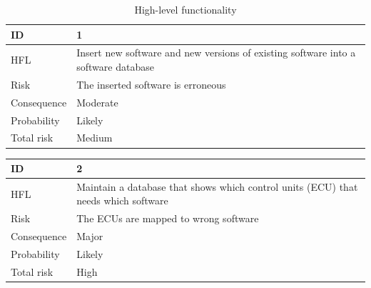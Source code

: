 \begin{table}[H]
\centering
\caption{High-level functionality}
\label{table:hlf}
\begin{tabularx}{1.0\textwidth}{
    |p{}%
    |p{}|%
}
\hline

ID
& 1
\\
\hline

HFL
& Insert new software and new versions of existing software into a software database
\\
\hline

Risk
& 
The inserted software is erroneous
\\
\hline

Consequence
&
Moderate
\\
\hline

Probability
&
Likely
\\
\hline

Total risk
&
Medium
\\
\hline


\end{tabularx}
\end{table}


\begin{table}[H]
\centering
\begin{tabularx}{1.0\textwidth}{
    |p{}%
    |p{}|%
}
\hline

ID
& 2
\\
\hline

HFL
& Maintain a database that shows which control units (ECU) that needs which software
\\
\hline

Risk
& 
The ECUs are mapped to wrong software
\\
\hline

Consequence
&
Major
\\
\hline

Probability
&
Likely
\\
\hline

Total risk
&
High
\\
\hline

\end{tabularx}
\end{table}

